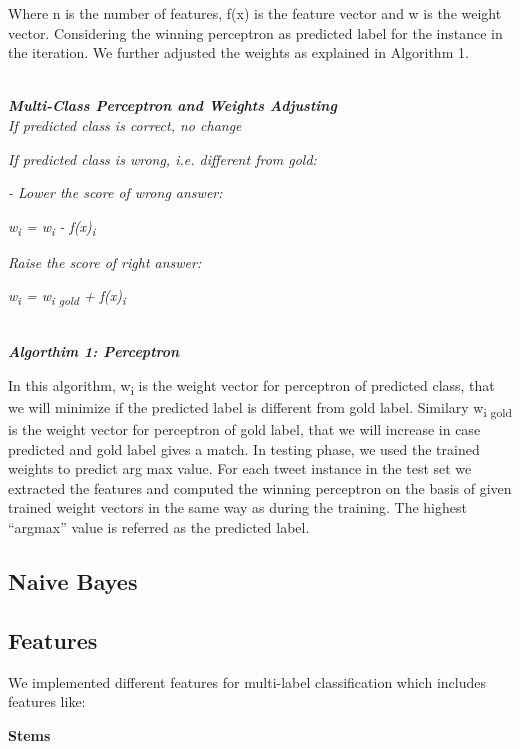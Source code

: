 \documentclass[11pt]{article}
\begin{document}
Where n is the number of features, f(x) is the feature vector and w is the weight vector. Considering the winning perceptron as predicted label for the instance in the iteration. We further adjusted the weights as explained in Algorithm 1.

\noindent\hrulefill\\
 \textbf{\emph {Multi-Class Perceptron and Weights Adjusting}} \\

\emph{ If predicted class is correct, no change}

\emph{If predicted class is wrong, i.e. different from gold:}

\emph{- Lower the score of wrong answer:}

\emph{w\textsubscript{i} = w\textsubscript{i} - f(x)\textsubscript{i}}

\emph{Raise the score of right answer:}

\emph{w\textsubscript{i} = w\textsubscript{i gold} + f(x)\textsubscript{i} }

\noindent\hrulefill\\
\textbf{\emph{ Algorthim 1: Perceptron }}

In this algorithm, w\textsubscript{i} is the weight vector for perceptron of predicted class, that we will minimize if the predicted label is different from gold label. Similary w\textsubscript{i gold} is the weight vector for perceptron of gold label, that we will increase in case predicted and gold label gives a match.
In testing phase, we used the trained weights to predict arg max value. For each tweet instance in the test set we extracted the features and computed the
winning perceptron on the basis of given trained weight vectors in the same way as during the training. The highest “argmax” value is referred as the
predicted label.\\

\subsection{Naive Bayes}



\subsection{Features}

We implemented different features for multi-label classification which includes features like:


{\bf Stems}
\end{document}
